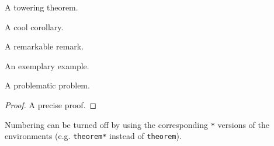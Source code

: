 \documentclass[10pt,letterpaper]{amsart}
\begin{document}
\begin{theorem}
  A towering theorem. 
\end{theorem}

\begin{corollary}
  A cool corollary. 
\end{corollary}

\begin{remark}
  A remarkable remark. 
\end{remark}

\begin{example}
  An exemplary example. 
\end{example}

\begin{problem}
  A problematic problem. 
\end{problem}

\begin{proof}
  A precise proof.
\end{proof}

Numbering can be turned off by using the corresponding \verb|*| versions of the environments (e.g. \verb|theorem*| instead of \verb|theorem|). 
\end{document}
